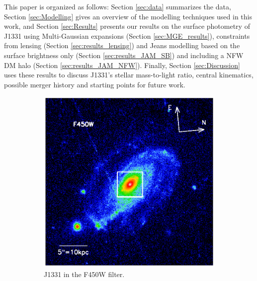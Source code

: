 \documentclass[useAMS,usenatbib]{mnras}
\begin{document}
This paper is organized as follows: Section \ref{sec:data} summarizes the data, Section \ref{sec:Modelling} gives an overview of the modelling techniques used in this work, and Section \ref{sec:Results} presents our results on the surface photometry of J1331 using Multi-Gaussian expansions (Section \ref{sec:MGE_results}), constraints from lensing (Section \ref{sec:results_lensing}) and Jeans modelling based on the surface brightness only (Section \ref{sec:results_JAM_SB}) and including a NFW DM halo (Section \ref{sec:results_JAM_NFW}). Finally, Section \ref{sec:Discussion} uses these results to discuss J1331's stellar mass-to-light ratio, central kinematics, possible merger history and starting points for future work.

\begin{figure}
\centering
\begin{subfigure}{.5\textwidth}
  \centering
  \includegraphics[width=.9\linewidth]{fig/first_glimpse_450.ps}
  \caption{J1331 in the F450W filter.}
  \label{fig:F450W}
\end{subfigure}%
\begin{subfigure}{.5\textwidth}
  \centering

\end{subfigure}
\end{figure}
\end{document}
